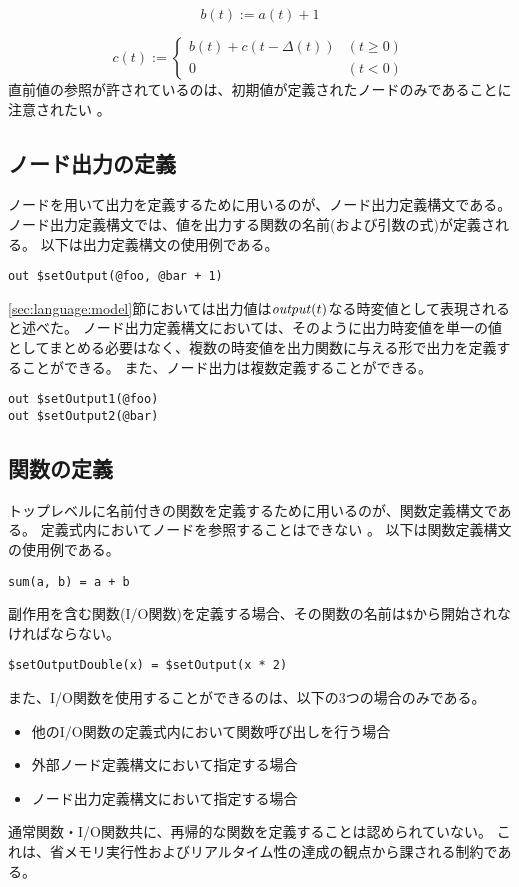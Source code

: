 \begin{equation*}
  b(t) := a(t) + 1
\end{equation*}

\begin{equation*}
  c(t) := \begin{cases}
    b(t) + c(t-\Delta(t)) & (t \geq 0) \\
    0 & (t < 0)
  \end{cases}
\end{equation*}
直前値の参照が許されているのは、初期値が定義されたノードのみであることに注意されたい \footnotemark[1]。

\subsection{ノード出力の定義}
ノードを用いて出力を定義するために用いるのが、ノード出力定義構文である。
ノード出力定義構文では、値を出力する関数の名前(および引数の式)が定義される。
以下は出力定義構文の使用例である。
\begin{lstlisting}[basicstyle=\ttfamily\small,language=SFRP]
out $setOutput(@foo, @bar + 1)
\end{lstlisting}
\ref{sec:language:model}節においては出力値は${\it output}(t)$なる時変値として表現されると述べた。
ノード出力定義構文においては、そのように出力時変値を単一の値としてまとめる必要はなく、複数の時変値を出力関数に与える形で出力を定義することができる。
また、ノード出力は複数定義することができる。
\begin{lstlisting}[basicstyle=\ttfamily\small,language=SFRP]
out $setOutput1(@foo)
out $setOutput2(@bar)
\end{lstlisting}

\subsection{関数の定義}
トップレベルに名前付きの関数を定義するために用いるのが、関数定義構文である。
定義式内においてノードを参照することはできない \footnotemark[1]。
以下は関数定義構文の使用例である。
\begin{lstlisting}[basicstyle=\ttfamily\small,language=SFRP]
sum(a, b) = a + b
\end{lstlisting}
副作用を含む関数(I/O関数)を定義する場合、その関数の名前は\texttt{\$}から開始されなければならない。
\begin{lstlisting}[basicstyle=\ttfamily\small,language=SFRP]
$setOutputDouble(x) = $setOutput(x * 2)
\end{lstlisting}
また、I/O関数を使用することができるのは、以下の3つの場合のみである。
\begin{itemize}
  \item 他のI/O関数の定義式内において関数呼び出しを行う場合
  \item 外部ノード定義構文において指定する場合
  \item ノード出力定義構文において指定する場合
\end{itemize}
通常関数・I/O関数共に、再帰的な関数を定義することは認められていない。
これは、省メモリ実行性およびリアルタイム性の達成の観点から課される制約である。

